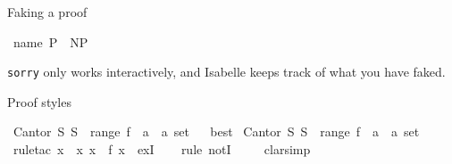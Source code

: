 \begin{isabellebody}
%
\begin{isamarkuptext}%
Faking a proof%
\end{isamarkuptext}\isamarkuptrue%
\isamarkupfalse%
\ name{}{\isacharcolon}{\kern0pt}\ {\isachardoublequoteopen}P\ {\isasymnoteq}\ NP{\isachardoublequoteclose}\isanewline
\ \ %
\isanewline
%
\isadelimproof
\ \ %
\endisadelimproof
%
\isatagproof
{}\isamarkupfalse%
%
\endisatagproof
{\isafoldproof}%
%
\isadelimproof
%
\endisadelimproof
%
\begin{isamarkuptext}%
{\tt sorry} only works interactively, 
  and Isabelle keeps track of what you have faked.%
\end{isamarkuptext}\isamarkuptrue%
%
\begin{isamarkuptext}%
Proof styles%
\end{isamarkuptext}\isamarkuptrue%
\isamarkupfalse%
\ Cantor{\isacharcolon}{\kern0pt}\ {\isachardoublequoteopen}{\isasymexists}S{\isachardot}{\kern0pt}\ S\ {\isasymnotin}\ range\ {\isacharparenleft}{\kern0pt}f\ {\isacharcolon}{\kern0pt}{\isacharcolon}{\kern0pt}\ {\isacharprime}{\kern0pt}a\ {\isasymRightarrow}\ {\isacharprime}{\kern0pt}a\ set{\isacharparenright}{\kern0pt}{\isachardoublequoteclose}%
\isadelimproof
\ %
\endisadelimproof
%
\isatagproof
{}\isamarkupfalse%
\ best\isanewline
\isanewline
%
%
\endisatagproof
{\isafoldproof}%
%
\isadelimproof
%
\endisadelimproof
\isanewline
{}\isamarkupfalse%
\ Cantor{\isacharprime}{\kern0pt}{\isacharcolon}{\kern0pt}\ {\isachardoublequoteopen}{\isasymexists}S{\isachardot}{\kern0pt}\ S\ {\isasymnotin}\ range\ {\isacharparenleft}{\kern0pt}f\ {\isacharcolon}{\kern0pt}{\isacharcolon}{\kern0pt}\ {\isacharprime}{\kern0pt}a\ {\isasymRightarrow}\ {\isacharprime}{\kern0pt}a\ set{\isacharparenright}{\kern0pt}{\isachardoublequoteclose}\ \isanewline
%
\isadelimproof
\ \ %
\endisadelimproof
%
\isatagproof
{}\isamarkupfalse%
\ {\isacharparenleft}{\kern0pt}rule{\isacharunderscore}{\kern0pt}tac\ x\ {\isacharequal}{\kern0pt}\ {\isachardoublequoteopen}{\isacharbraceleft}{\kern0pt}x{\isachardot}{\kern0pt}\ x\ {\isasymnotin}\ f\ x{\isacharbraceright}{\kern0pt}{\isachardoublequoteclose}\ \ exI{\isacharparenright}{\kern0pt}\isanewline
\ \ \isamarkupfalse%
\ {\isacharparenleft}{\kern0pt}rule\ notI{\isacharparenright}{\kern0pt}\ \isanewline
\ \ \isamarkupfalse%
\ clarsimp\isanewline
\ \ \isamarkupfalse%

\end{isabellebody}
